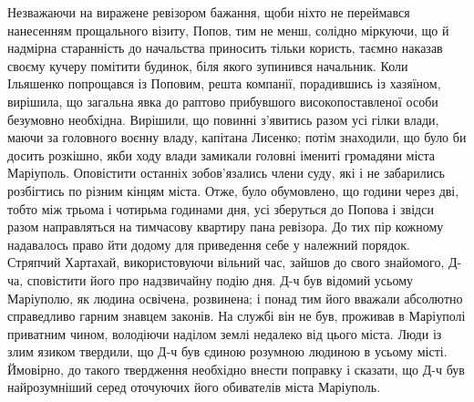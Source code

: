 \documentclass[a4paper,20pt]{report}
\begin{document}
Незважаючи на виражене ревізором бажання, щоби ніхто не переймався
нанесенням прощального візиту, Попов, тим не менш, солідно міркуючи, що й 
надмірна старанність до начальства приносить тільки користь, таємно наказав
своєму кучеру помітити будинок, біля якого зупинився начальник. Коли Ільяшенко
попрощався із Поповим, решта компанії, порадившись із хазяїном, вирішила, що загальна
явка до раптово прибувшого високопоставленої особи безумовно необхідна. Вирішили, 
що повинні з'явитись разом усі гілки влади, маючи за головного воєнну владу,
капітана Лисенко; потім знаходили, що було би досить розкішно, якби ходу
влади замикали головні імениті громадяни міста Маріуполь. Оповістити останніх
зобов'язались члени суду, які і не забарились розбігтись по різним кінцям міста.
Отже, було обумовлено, що години через дві, тобто між трьома і чотирьма годинами дня,
усі зберуться до Попова і звідси разом направляться на тимчасову квартиру
пана ревізора. До тих пір кожному надавалось право йти додому для приведення себе у 
належний порядок. Стряпчий Хартахай, використовуючи вільний час, зайшов до свого знайомого, Д-ча,
сповістити його про надзвичайну подію дня. Д-ч був відомий усьому Маріуполю, як людина освічена, розвинена;
і понад тим його вважали абсолютно справедливо гарним знавцем законів.
На службі він не був, проживав в Маріуполі приватним чином, володіючи наділом землі недалеко від цього міста.
Люди із злим язиком твердили, що Д-ч був єдиною розумною людиною в усьому місті. Ймовірно, до такого
твердження необхідно внести поправку і сказати, що Д-ч був найрозумніший серед оточуючих його
обивателів міста Маріуполь.
\end{document}

